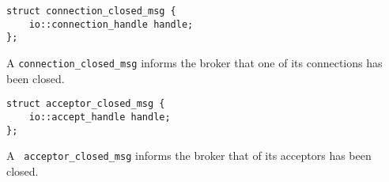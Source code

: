 \begin{lstlisting}
struct connection_closed_msg {
    io::connection_handle handle;
};
\end{lstlisting}

A \lstinline^connection_closed_msg^ informs the broker that one of its connections has been closed.

\begin{lstlisting}
struct acceptor_closed_msg {
    io::accept_handle handle;
};
\end{lstlisting}

A \lstinline^ acceptor_closed_msg^ informs the broker that of its acceptors has been closed.
